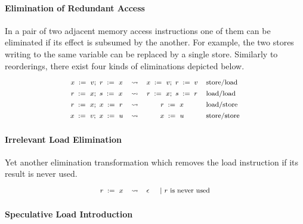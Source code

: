 \paragraph{Elimination of Redundant Access} 

In a pair of two adjacent memory access instructions 
one of them can be eliminated if its effect 
is subsumed by the another. 
For example, the two stores writing to the same variable 
can be replaced by a single store.  
Similarly to reorderings, there exist four kinds 
of eliminations depicted below. 
%
\[\def\arraystretch{1.4}\footnotesize
  \begin{array}{cccl} 

      \writeInst{}{x}{v} \seq \readInst{}{r}{x} 
    & \leadsto 
    & \writeInst{}{x}{v} \seq \assignInst{r}{v}
    & \text{store/load}  \\ 

      \readInst{}{r}{x} \seq \readInst{}{s}{x} 
    & \leadsto 
    & \readInst{}{r}{x} \seq \assignInst{s}{r}
    & \text{load/load}  \\ 

      \readInst{}{r}{x} \seq \writeInst{}{x}{r} 
    & \leadsto 
    & \readInst{}{r}{x} 
    & \text{load/store}  \\ 

      \writeInst{}{x}{v} \seq \writeInst{}{x}{u} 
    & \leadsto 
    & \writeInst{}{x}{u}
    & \text{store/store}  \\ 

  \end{array}
\]

\paragraph{Irrelevant Load Elimination}

Yet another elimination transformation 
which removes the load instruction if its 
result is never used. 
%
\[\def\arraystretch{1.4}\footnotesize
  \begin{array}{cccl} 

      \readInst{}{r}{x} 
    & \leadsto 
    & \epsInst
    & ~|~ \text{$r$ is never used}  \\ 

  \end{array}
\]

\paragraph{Speculative Load Introduction}

